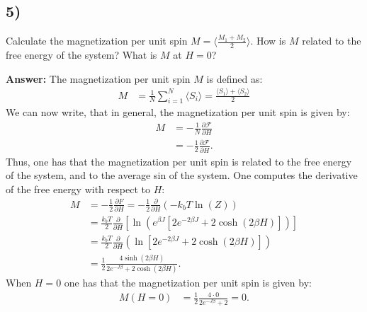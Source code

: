 \documentclass[a4paper]{article}
\newcommand{\newparagraph}{\vspace{.5cm}\noindent}
\newcommand{\average}[1]{\langle #1 \rangle}
\begin{document}
\subsection*{5)}
Calculate the magnetization per unit spin $M =\langle\frac{M_1 + M_2}{2}\rangle$. How is $M$ related to the free energy of the system?
What is $M$ at $H = 0$?

\newparagraph
\textbf{Answer:} The magnetization per unit spin $M$ is defined as:
\begin{align*}
    M &= \frac{1}{N}\sum_{i = 1}^N \average{S_i} = \frac{\average{S_1} + \average{S_2}}{2}
\end{align*}
We can now write, that in general, the magnetization per unit spin is given by:
\begin{align*}
    M &= -\frac{1}{N}\frac{\partial\mathcal{F}}{\partial H}\\
    &= -\frac{1}{2}\frac{\partial \mathcal{F}}{\partial H}.
\end{align*}Thus, one has that the magnetization per unit spin is related to the free energy of the system, and to the average sin of the system.
One computes the derivative of the free energy with respect to $H$:
\begin{align*}
    M &=-\frac{1}{2}\frac{\partial F}{\partial H} = -\frac{1}{2}\frac{\partial}{\partial H}\left(-k_bT\ln(Z)\right)\\
    &=\frac{k_bT}{2}\frac{\partial}{\partial H}\left[\ln\left(e^{\beta J}\left[2e^{-2\beta J} + 2\cosh(2\beta H)\right]\right)\right]\\
    &=\frac{k_bT}{2}\frac{\partial}{\partial H}\left(\ln\left[2e^{-2\beta J} + 2\cosh(2\beta H)\right]\right)\\
    &=\frac{1}{2}\frac{4 \sinh(2\beta H)}{2e^{-J\beta} + 2\cosh(2\beta H)}.
\end{align*}When $H = 0$ one has that the magnetization per unit spin is given by:
\begin{align*}
    M(H = 0) &= \frac{1}{2}\frac{4 \cdot 0}{2e^{-J\beta} + 2} = 0.
\end{align*}
\end{document}
